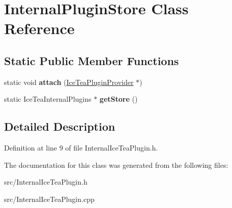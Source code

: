 \hypertarget{class_internal_plugin_store}{}\section{Internal\+Plugin\+Store Class Reference}
\label{class_internal_plugin_store}
\subsection*{Static Public Member Functions}
\begin{DoxyCompactItemize}
\item 
static void {\bfseries attach} (\hyperlink{class_ice_tea_plugin_provider}{Ice\+Tea\+Plugin\+Provider} $\ast$)\hypertarget{class_internal_plugin_store_a10dec2dec6852eb858898b158a2aac5c}{}\label{class_internal_plugin_store_a10dec2dec6852eb858898b158a2aac5c}

\item 
static Ice\+Tea\+Internal\+Plugins $\ast$ {\bfseries get\+Store} ()\hypertarget{class_internal_plugin_store_ac3d7dbf6f9b4fc8d1b8084cd6c6c91e9}{}\label{class_internal_plugin_store_ac3d7dbf6f9b4fc8d1b8084cd6c6c91e9}

\end{DoxyCompactItemize}


\subsection{Detailed Description}


Definition at line 9 of file Internal\+Ice\+Tea\+Plugin.\+h.



The documentation for this class was generated from the following files\+:\begin{DoxyCompactItemize}
\item 
src/Internal\+Ice\+Tea\+Plugin.\+h\item 
src/Internal\+Ice\+Tea\+Plugin.\+cpp\end{DoxyCompactItemize}
